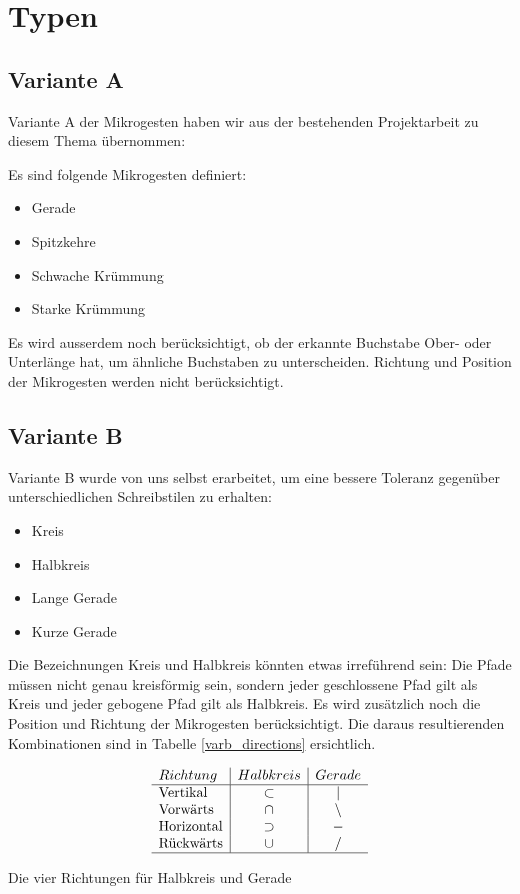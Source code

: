 \section{Typen}
\subsection{Variante A}
Variante A der Mikrogesten haben wir aus der bestehenden Projektarbeit \cite{zeichenerkennung_pa} zu diesem Thema übernommen: 

Es sind folgende Mikrogesten definiert:
\begin{itemize}
\item Gerade
\item Spitzkehre
\item Schwache Krümmung
\item Starke Krümmung
\end{itemize}

Es wird ausserdem noch berücksichtigt, ob der erkannte Buchstabe Ober- oder Unterlänge hat, um ähnliche Buchstaben zu unterscheiden. Richtung und Position der Mikrogesten werden nicht berücksichtigt.

\subsection{Variante B}
Variante B wurde von uns selbst erarbeitet, um eine bessere Toleranz gegenüber unterschiedlichen Schreibstilen zu erhalten:\begin{itemize}
\item Kreis
\item Halbkreis
\item Lange Gerade
\item Kurze Gerade
\end{itemize}

Die Bezeichnungen Kreis und Halbkreis könnten etwas irreführend sein: Die Pfade müssen nicht genau kreisförmig sein, sondern jeder geschlossene Pfad gilt als Kreis und jeder gebogene Pfad gilt als Halbkreis. Es wird zusätzlich noch die Position und Richtung der Mikrogesten berücksichtigt. Die daraus resultierenden Kombinationen sind in Tabelle \ref{varb_directions} ersichtlich.

\begin{table}[h!]
  \begin{center}
\[
    \begin{array}{l | c | c }
    Richtung & Halbkreis & Gerade \\
    \hline
   \mbox{Vertikal} & \subset & | \\
    \mbox{Vorwärts} & \cap & \backslash \\
    \mbox{Horizontal} & \supset & - \\
    \mbox{Rückwärts} & \cup & / \\
    \hline
    \end{array}
\]
  \end{center}
  \caption{Die vier Richtungen für Halbkreis und Gerade}
  \label{varb_directions}
\end{table}


